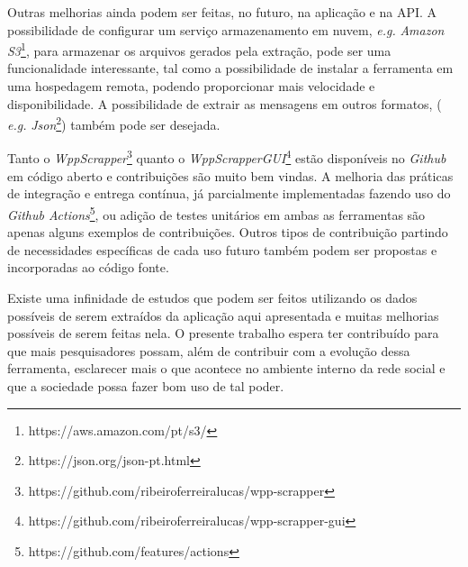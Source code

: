 Outras melhorias ainda podem ser feitas, no futuro, na aplicação e na API. A possibilidade de configurar um serviço armazenamento em nuvem, \textit{e.g.} \textit{Amazon S3}\footnote{https://aws.amazon.com/pt/s3/}, para armazenar os arquivos gerados pela extração, pode ser uma funcionalidade interessante, tal como a possibilidade de instalar a ferramenta em uma hospedagem remota, podendo proporcionar mais velocidade e disponibilidade. A possibilidade de extrair as mensagens em outros formatos, ( \textit{e.g.} \textit{Json}\footnote{https://json.org/json-pt.html}) também pode ser desejada.

Tanto o \textit{WppScrapper}\footnote{https://github.com/ribeiroferreiralucas/wpp-scrapper} quanto o \textit{WppScrapperGUI}\footnote{https://github.com/ribeiroferreiralucas/wpp-scrapper-gui} estão disponíveis no \textit{Github} em código aberto e contribuições são muito bem vindas. A melhoria das práticas de integração e entrega contínua, já parcialmente implementadas fazendo uso do \textit{Github Actions}\footnote{https://github.com/features/actions}, ou adição de testes unitários em ambas as ferramentas são apenas alguns exemplos de contribuições. Outros tipos de contribuição partindo de necessidades específicas de cada uso futuro também podem ser propostas e incorporadas ao código fonte.

Existe uma infinidade de estudos que podem ser feitos utilizando os dados possíveis de serem extraídos da aplicação aqui apresentada e muitas melhorias possíveis de serem feitas nela. O presente trabalho espera ter contribuído para que mais pesquisadores possam, além de contribuir com a evolução dessa ferramenta, esclarecer mais o que acontece no ambiente interno da rede social e que a sociedade possa fazer bom uso de tal poder.